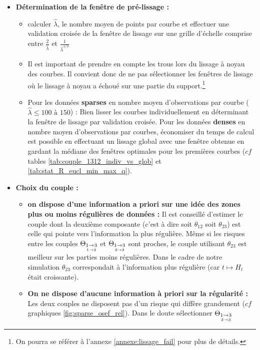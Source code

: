 \begin{itemize}
	\item \textbf{Détermination de la fenêtre de pré-lissage :}
	\begin{itemize}
		
		\item calculer $\widehat \lambda$, le nombre moyen de points par courbe et effectuer une validation croisée de la fenêtre de lissage sur une grille d'échelle comprise entre $\displaystyle\frac{2}{\widehat \lambda}$ et $\displaystyle\frac{1}{\widehat \lambda^{1/3}}$

		\item Il est important de prendre en compte les \og trous \fg lors du lissage à noyau des courbes. Il convient donc de ne pas sélectionner les fenêtres de lissage où le lissage à noyau a échoué sur une partie du support.\footnote{On pourra se référer à l'annexe \ref{annexe:lissage_fail} pour plus de détails.}

		\item Pour les données \textbf{\og sparses \fg} en nombre moyen d'observations par courbe ($\widehat \lambda \leq  100 \textsf{ à } 150$) : Bien lisser les courbes individuellement en déterminant la fenêtre de lissage par validation croisée. Pour les données \textbf{\og denses \fg} en nombre moyen d'observations par courbes, économiser du temps de calcul est possible en effectuant un lissage global avec une fenêtre obtenue en gardant la médiane des fenêtres optimales pour les premières courbes ($cf$ tables \ref{tab:couple_1312_indiv_vs_glob} et \ref{tab:stat_R_eucl_min_max_q}).
	\end{itemize}

	\bigskip

	\item \textbf{Choix du couple :}

	\begin{itemize}
		\item \textbf{on dispose d'une information a priori sur une idée des zones plus ou moins régulières de données :} Il est conseillé d'estimer le couple dont la deuxième composante (c'est à dire soit $\theta_{12}$ soit $\theta_{23}$) est celle qui pointe vers l'information la plus régulière. Même si les risques entre les couples $\Theta_{\underset{1 \rightarrow 2}{1 \rightarrow 3}}$ et $\Theta_{\underset{2 \rightarrow 3}{1 \rightarrow 3}}$ sont proches, le couple utilisant $\theta_{23}$ est meilleur sur les parties moins régulières. Dans le cadre de notre simulation $\theta_{23}$ correspondait à l'information plus régulière (car $t \mapsto H_t$ était croissante).
		\item \textbf{On ne dispose d'aucune information à priori sur la régularité :} Les deux couples ne disposent pas d'un risque qui diffère grandement ($cf$ graphiques \ref{fig:sparse_osef_rel}). Dans le doute sélectionner $\Theta_{\underset{2 \rightarrow 3}{1 \rightarrow 3}}$
	\end{itemize}


\end{itemize}
